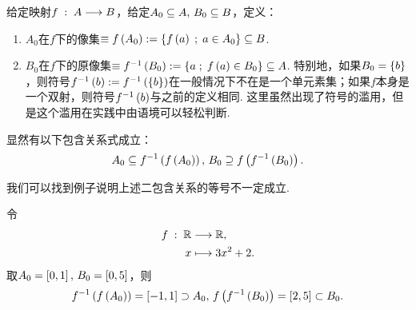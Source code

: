 \begin{definition}[像集和原像集]
    给定映射$f\;:\;A\ra B$，给定$A_0\sb A,\,B_0\sb B$，定义：
    \begin{enumerate}
        \item $A_0$在$f$下的像集$\equiv f\z(A_0\y) \defi \z\{ f\z(a\y)\;;\;a\in A_0  \y\}\sb B$.
        \item $B_0$在$f$下的原像集$\equiv f\inv\z(B_0\y) \defi \z\{ a\;;\;f\z(a\y)\in B_0  \y\}\sb A$. 
        特别地，如果$B_0=\z\{b\y\}$，则符号$f\inv\z(b\y)\defi f\inv\z(  \z\{b\y\}  \y)$在一般情况下不在是一个单元素集；如果$f$本身是一个双射，则符号$f\inv\z(b\y)$与之前的定义相同. 这里虽然出现了符号的滥用，但是这个滥用在实践中由语境可以轻松判断.
    \end{enumerate}
    显然有以下包含关系式成立：\[     A_0\sb f\inv\z(  f\z( A_0 \y)  \y),\,B_0\sp f\z(  f\inv\z(   B_0  \y)  \y).   \]
\end{definition}
我们可以找到例子说明上述二包含关系的等号不一定成立.
\begin{example}
    令
    \begin{align*}
        f\;:\; \R &\ra \R, \\
        x &\mapsto 3x^2+2.
    \end{align*}
    取$A_0=\z[0,1\y],\,B_0=\z[0,5\y]$，则
    \[  f\inv\z(  f\z( A_0 \y)  \y)=\z[-1,1\y]\supset A_0 ,\, f\z(  f\inv\z(   B_0  \y)  \y)=\z[2,5\y]\subset B_0.  \]
\end{example}

